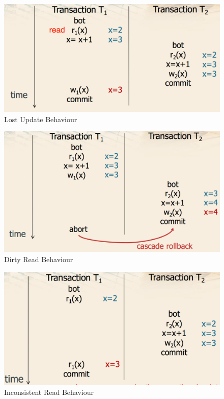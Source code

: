 \documentclass[12pt]{article}
\begin{document}
\begin{figure}[h!]
  \includegraphics[width=\linewidth]{images/lost_update.png}
  \caption{Lost Update Behaviour}
  \label{fig:lost_update}
\end{figure}
\begin{figure}[h!]
  \includegraphics[width=\linewidth]{images/dirty_read.png}
  \caption{Dirty Read Behaviour}
  \label{fig:dirty_read}
\end{figure}
\begin{figure}[h!]
  \includegraphics[width=\linewidth]{images/inco_read.png}
  \caption{Inconsistent Read Behaviour}
  \label{fig:inco_read}
\end{figure}
\end{document}
